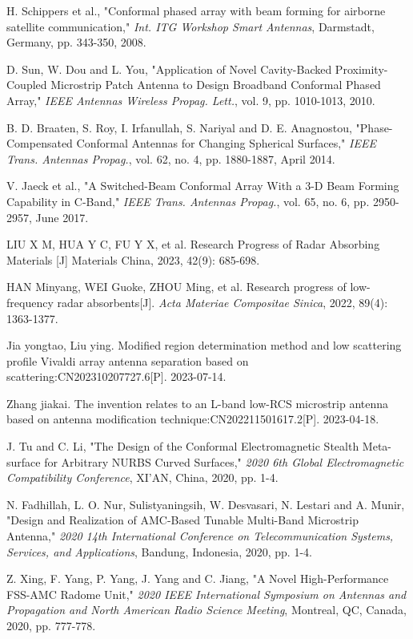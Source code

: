 \documentclass[USenglish]{article}
\theoremstyle{dgthm}
\theoremstyle{dgdef}
\begin{document}
\begin{thebibliography}{99}
H. Schippers et al., "Conformal phased array with beam forming for airborne satellite communication," \emph{Int. ITG Workshop Smart Antennas}, Darmstadt, Germany, pp. 343-350, 2008.

D. Sun, W. Dou and L. You, "Application of Novel Cavity-Backed Proximity-Coupled Microstrip Patch Antenna to Design Broadband Conformal Phased Array," \emph{IEEE Antennas Wireless Propag. Lett.}, vol. 9, pp. 1010-1013, 2010.

B. D. Braaten, S. Roy, I. Irfanullah, S. Nariyal and D. E. Anagnostou, "Phase-Compensated Conformal Antennas for Changing Spherical Surfaces," \emph{IEEE Trans.  Antennas Propag.}, vol. 62, no. 4, pp. 1880-1887, April 2014.

V. Jaeck et al., "A Switched-Beam Conformal Array With a 3-D Beam Forming Capability in C-Band," \emph{IEEE Trans.  Antennas Propag.}, vol. 65, no. 6, pp. 2950-2957, June 2017.

LIU X M, HUA Y C, FU Y X, et al. Research Progress of Radar Absorbing Materials [J] Materials China, 2023, 42(9): 685-698.

HAN Minyang, WEI Guoke, ZHOU Ming, et al. Research progress of low-frequency radar absorbents[J]. \emph{Acta Materiae Compositae Sinica}, 2022, 89(4): 1363-1377.

Jia yongtao, Liu ying. Modified region determination method and low scattering profile Vivaldi array antenna separation based on scattering:CN202310207727.6[P]. 2023-07-14.

Zhang jiakai. The invention relates to an L-band low-RCS microstrip antenna based on antenna modification technique:CN202211501617.2[P]. 2023-04-18.

J. Tu and C. Li, "The Design of the Conformal Electromagnetic Stealth Meta-surface for Arbitrary NURBS Curved Surfaces," \emph{2020 6th Global Electromagnetic Compatibility Conference}, XI'AN, China, 2020, pp. 1-4.

N. Fadhillah, L. O. Nur, Sulistyaningsih, W. Desvasari, N. Lestari and A. Munir, "Design and Realization of AMC-Based Tunable Multi-Band Microstrip Antenna," \emph{2020 14th International Conference on Telecommunication Systems, Services, and Applications}, Bandung, Indonesia, 2020, pp. 1-4.

Z. Xing, F. Yang, P. Yang, J. Yang and C. Jiang, "A Novel High-Performance FSS-AMC Radome Unit," \emph{2020 IEEE International Symposium on Antennas and Propagation and North American Radio Science Meeting}, Montreal, QC, Canada, 2020, pp. 777-778.


\end{thebibliography}
\end{document}
